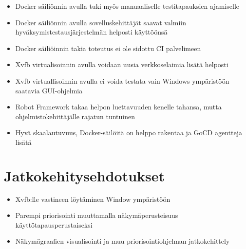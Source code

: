   \begin{itemize}
    \item Docker säiliönnin avulla tuki myös manuaaliselle testitapauksien ajamiselle
    \item Docker säiliönnin avulla sovelluskehittäjät saavat valmiin hyväksymistestausjärjestelmän helposti käyttöönsä
    \item Docker säiliöinnin takia toteutus ei ole sidottu CI palvelimeen
    \item Xvfb virtualisoinnin avulla voidaan uusia verkkoselaimia lisätä helposti
    \item Xvfb virtuallisoinnin avulla ei voida testata vain Windows ympäristöön saatavia GUI-ohjelmia
    \item Robot Framework takaa helpon luettavuuden kenelle tahansa, mutta ohjelmistokehittäjälle rajatun tuntuinen
    \item Hyvä skaalautuvuus, Docker-säilöitä on helppo rakentaa ja GoCD agentteja lisätä
  \end{itemize}

\section{Jatkokehitysehdotukset} \label{ch:12_jatkokehitysehdotukset}

  \begin{itemize}
    \item Xvfb:lle vastineen löytäminen Window ympäristöön
    \item Parempi priorisointi muuttamalla näkymäperusteisuus käyttötapausperustaiseksi
    \item Näkymägraafien visualisointi ja muu priorisointiohjelman jatkokehittely
  \end{itemize}